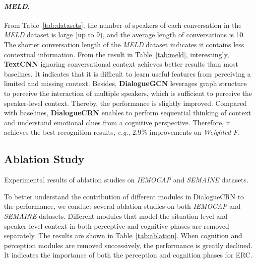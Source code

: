 \documentclass[11pt,a4paper]{article}
\begin{document}
\paragraph{\textit{MELD}.}
From Table~\ref{tab:datasets}, the number of speakers of each conversation in the {\it MELD} dataset is large (up to 9), and the average length of conversations is 10.
The shorter conversation length of the {\it MELD} dataset indicates it contains less contextual information.
From the result in Table~\ref{tab:meld}, interestingly, \textbf{TextCNN} ignoring conversational context achieves better results than most baselines.
It indicates that it is difficult to learn useful features from perceiving a limited and missing context.
Besides, \textbf{DialogueGCN} leverages graph structure to perceive the interaction of multiple speakers, which is sufficient to perceive the speaker-level context. Thereby, the performance is slightly improved. 
Compared with baselines, \textbf{DialogueCRN} enables to perform sequential thinking of context and understand emotional clues from a cognitive perspective. 
Therefore, it achieves the best recognition results, \textit{e.g.},  2.9\% improvements on \textit{Weighted-F}.


\subsection{Ablation Study}



\begin{table*}[t]
  \centering
      \resizebox{0.98\linewidth}{!}{11\checkmark\checkmark\checkmark\checkmark\checkmark\times\checkmark\checkmark\times\checkmark\checkmark\checkmark\times\times\checkmark\checkmark\times\times\times\checkmark\times\times\checkmark\times\times\times\times\times}
  \caption{Experimental results of ablation studies on {\it IEMOCAP} and {\it SEMAINE} datasets. } \label{tab:ablation}
  \end{table*}

To better understand the contribution of different modules in DialogueCRN to the performance, we conduct several ablation studies on both \textit{IEMOCAP} and \textit{SEMAINE} datasets.
Different modules that model the situation-level and speaker-level context in both perceptive and cognitive phases are removed separately.
The results are shown in Table~\ref{tab:ablation}. 
When cognition and perception modules are removed successively, the performance is greatly declined.
It indicates the importance of both the perception and cognition phases for ERC.
\end{document}

